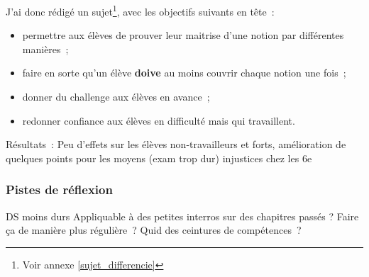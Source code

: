 J'ai donc rédigé un sujet\footnote{Voir annexe \ref{sujet_differencie}}, avec les objectifs suivants
en tête :

\begin{itemize}
    \item permettre aux élèves de prouver leur maitrise d'une notion par différentes manières ;
    \item faire en sorte qu'un élève \textbf{doive} au moins couvrir chaque notion une fois ;
    \item donner du challenge aux élèves en avance ;
    \item redonner confiance aux élèves en difficulté mais qui travaillent.
\end{itemize}


Résultats :
Peu d'effets sur les élèves non-travailleurs et forts, amélioration de quelques
points pour les moyens (exam trop dur)
injustices chez les 6e

\subsubsection{Pistes de réflexion}

DS moins durs
Appliquable à des petites interros sur des chapitres passés ?
Faire ça de manière plus régulière ?
Quid des ceintures de compétences ?
